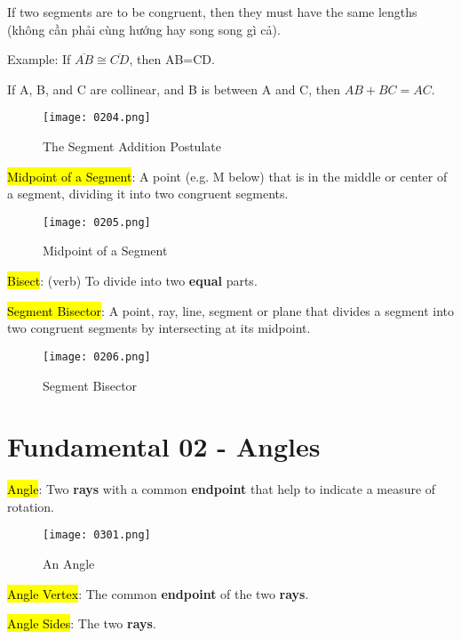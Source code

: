 If two segments are to be congruent, then they must have the same lengths (không cần phải cùng hướng hay song song gì cả).

Example: If $\overline{AB} \cong \overline{CD}$, then AB=CD.

\begin{tcolorbox}[colback=blue!5!white,colframe=blue!75!black,title=The Segmennt Addition Postulate]
  If A, B, and C are collinear, and B is between A and C, then $AB + BC = AC$.
\end{tcolorbox}

\begin{figure}[h]
  \centering
  \texttt{[image: 0204.png]}
  \caption{The Segment Addition Postulate}
\end{figure}

\hl{Midpoint of a Segment}: A point (e.g. M below) that is in the middle or center of a segment, dividing it into two congruent segments.

\begin{figure}[h]
  \centering
  \texttt{[image: 0205.png]}
  \caption{Midpoint of a Segment}
\end{figure}

\hl{Bisect}: (verb) To divide into two \textbf{equal} parts.

\hl{Segment Bisector}: A point, ray, line, segment or plane that divides a segment into two congruent segments by intersecting at its midpoint.

\begin{figure}[htb!]
  \centering
  \texttt{[image: 0206.png]}
  \caption{Segment Bisector}
\end{figure}

\section{Fundamental 02 - Angles}

\hl{Angle}: Two \textbf{rays} with a common \textbf{endpoint} that help to indicate a measure of rotation.

\begin{figure}[htb!]
  \centering
  \texttt{[image: 0301.png]}
  \caption{An Angle}
\end{figure}

\hl{Angle Vertex}: The common \textbf{endpoint} of the two \textbf{rays}.

\hl{Angle Sides}: The two \textbf{rays}.

